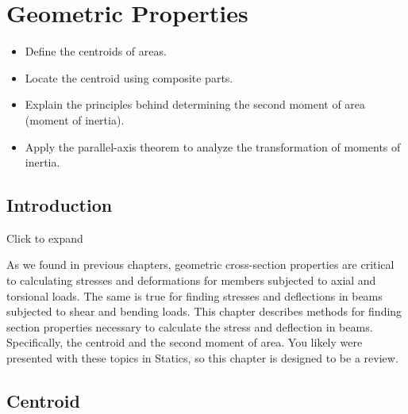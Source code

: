 \documentclass[
  letterpaper,
  DIV=11,
  numbers=noendperiod]{scrreprt}
\providecommand{\tightlist}{%
  \setlength{\itemsep}{0pt}\setlength{\parskip}{0pt}}\usepackage{longtable,booktabs,array}
\begin{document}

\chapter{Geometric Properties}\label{sec-geometric-properties}

\begin{tcolorbox}[enhanced jigsaw, breakable, opacityback=0, toptitle=1mm, left=2mm, colback=white, opacitybacktitle=0.6, colframe=quarto-callout-note-color-frame, titlerule=0mm, arc=.35mm, leftrule=.75mm, bottomtitle=1mm, colbacktitle=quarto-callout-note-color!10!white, rightrule=.15mm, title={Learning Objectives}, bottomrule=.15mm, toprule=.15mm, coltitle=black]

\begin{itemize}
\tightlist
\item
  Define the centroids of areas.
\item
  Locate the centroid using composite parts.
\item
  Explain the principles behind determining the second moment of area
  (moment of inertia).
\item
  Apply the parallel-axis theorem to analyze the transformation of
  moments of inertia.
\end{itemize}

\end{tcolorbox}

\section*{Introduction}\label{introduction-8}


Click to expand

As we found in previous chapters, geometric cross-section properties are
critical to calculating stresses and deformations for members subjected
to axial and torsional loads. The same is true for finding stresses and
deflections in beams subjected to shear and bending loads. This chapter
describes methods for finding section properties necessary to calculate
the stress and deflection in beams. Specifically, the centroid and the
second moment of area. You likely were presented with these topics in
Statics, so this chapter is designed to be a review.

\section{Centroid}\label{sec-8.1}
\end{document}
